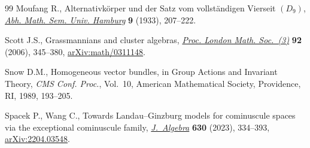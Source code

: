 \documentclass[pdftex]{sigma}
\numberwithin{equation}{section}
\theoremstyle{definition}
\begin{document}
\begin{thebibliography}{99}
Moufang R., Alternativk\"orper und der {S}atz vom vollst\"andigen {V}ierseit
 {$(D_9)$}, \href{https://doi.org/10.1007/BF02940648}{\textit{Abh. Math. Sem. Univ. Hamburg}} \textbf{9} (1933),
 207--222.

Scott J.S., Grassmannians and cluster algebras, \href{https://doi.org/10.1112/S0024611505015571}{\textit{Proc. London Math.
 Soc.~(3)}} \textbf{92} (2006), 345--380, \href{https://arxiv.org/abs/math/0311148}{arXiv:math/0311148}.

Snow D.M., Homogeneous vector bundles, in Group {A}ctions and {I}nvariant
 {T}heory, \textit{CMS Conf. Proc.}, Vol.~10, American Mathematical Society,
 Providence, RI, 1989, 193--205.

Spacek P., Wang C., Towards {L}andau--{G}inzburg models for cominuscule spaces
 via the exceptional cominuscule family, \href{https://doi.org/10.1016/j.jalgebra.2023.03.039}{\textit{J.~Algebra}} \textbf{630}
 (2023), 334--393, \href{https://arxiv.org/abs/2204.03548}{arXiv:2204.03548}.

\end{thebibliography}\LastPageEnding
\end{document}
